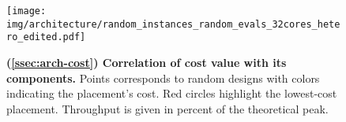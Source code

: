 \begin{figure*}[h]
\centering
\captionsetup{justification=centering}
\texttt{[image: img/architecture/random\_instances\_random\_evals\_32cores\_hetero\_edited.pdf]}
\caption{\textbf{(\textsection \ref{ssec:arch-cost}) Correlation of cost value with its components.}
Points corresponds to random designs with colors indicating the placement's cost.
Red circles highlight the lowest-cost placement.
Throughput is given in percent of the theoretical peak.
}
\label{fig:arch-set-weight}
\vspace{-1.0em}
\end{figure*}
